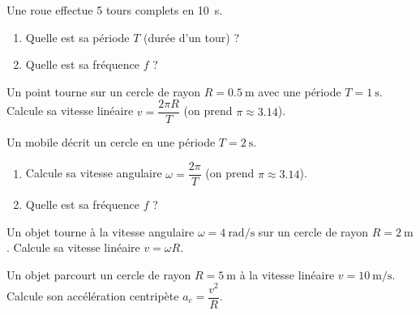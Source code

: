 \documentclass[11pt,a4paper]{article}
\begin{document}

\begin{exo}
Une roue effectue \num{5} tours complets en \qty{10}{\second}.
\begin{enumerate}[label=\alph*)]
  \item Quelle est sa période $T$ (durée d'un tour) ?
  \item Quelle est sa fréquence $f$ ?
\end{enumerate}
\end{exo}

\begin{exo}
Un point tourne sur un cercle de rayon $R=\qty{0,5}{\metre}$ avec une période $T=\qty{1}{\second}$.
Calcule sa vitesse linéaire $v=\dfrac{2\pi R}{T}$ (on prend $\pi\approx\num{3,14}$).
\end{exo}

\begin{exo}
Un mobile décrit un cercle en une période $T=\qty{2}{\second}$.
\begin{enumerate}[label=\alph*)]
  \item Calcule sa vitesse angulaire $\omega=\dfrac{2\pi}{T}$ (on prend $\pi\approx\num{3,14}$).
  \item Quelle est sa fréquence $f$ ?
\end{enumerate}
\end{exo}

\begin{exo}
Un objet tourne à la vitesse angulaire $\omega=\qty{4}{\radian\per\second}$ sur un cercle de rayon
$R=\qty{2}{\metre}$. Calcule sa vitesse linéaire $v=\omega R$.
\end{exo}

\begin{exo}
Un objet parcourt un cercle de rayon $R=\qty{5}{\metre}$ à la vitesse linéaire $v=\qty{10}{\metre\per\second}$.
Calcule son accélération centripète $a_c=\dfrac{v^2}{R}$.
\end{exo}
\end{document}
